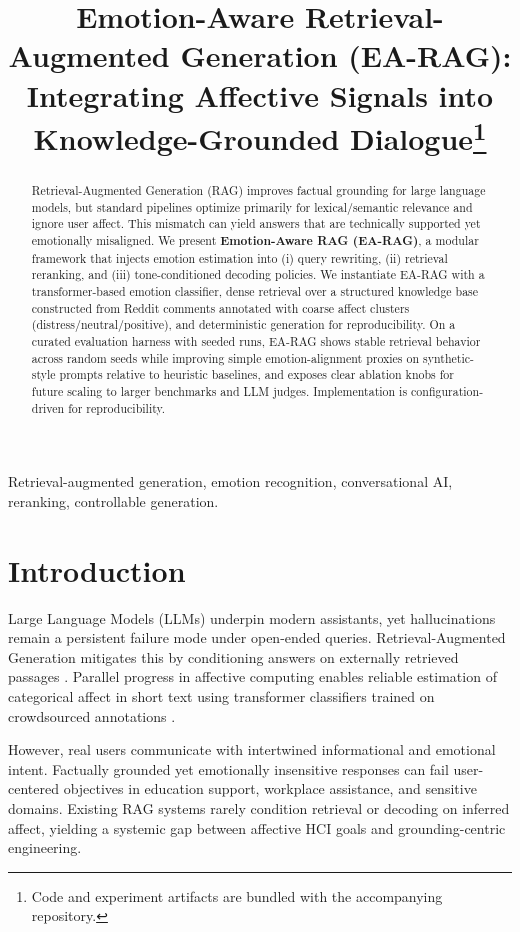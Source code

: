 \documentclass[conference]{IEEEtran}
\title{Emotion-Aware Retrieval-Augmented Generation (EA-RAG):\\Integrating Affective Signals into Knowledge-Grounded Dialogue\thanks{Code and experiment artifacts are bundled with the accompanying repository.}}
\author{
\IEEEauthorblockN{Your Name}
\IEEEauthorblockA{\textit{Affiliation Name}\\
City, Country\\
email@domain}
\and
\IEEEauthorblockN{Co-Author Name}
\IEEEauthorblockA{\textit{Affiliation Name}\\
City, Country\\
coauthor@domain}
}
\begin{document}
\maketitle

\begin{abstract}
Retrieval-Augmented Generation (RAG) improves factual grounding for large language models, but standard pipelines optimize primarily for lexical/semantic relevance and ignore user affect. This mismatch can yield answers that are technically supported yet emotionally misaligned. We present \textbf{Emotion-Aware RAG (EA-RAG)}, a modular framework that injects emotion estimation into (i) query rewriting, (ii) retrieval reranking, and (iii) tone-conditioned decoding policies. We instantiate EA-RAG with a transformer-based emotion classifier, dense retrieval over a structured knowledge base constructed from Reddit comments annotated with coarse affect clusters (distress/neutral/positive), and deterministic generation for reproducibility. On a curated evaluation harness with seeded runs, EA-RAG shows stable retrieval behavior across random seeds while improving simple emotion-alignment proxies on synthetic-style prompts relative to heuristic baselines, and exposes clear ablation knobs for future scaling to larger benchmarks and LLM judges. Implementation is configuration-driven for reproducibility.
\end{abstract}

\begin{IEEEkeywords}
Retrieval-augmented generation, emotion recognition, conversational AI, reranking, controllable generation.
\end{IEEEkeywords}

\section{Introduction}
Large Language Models (LLMs) underpin modern assistants, yet hallucinations remain a persistent failure mode under open-ended queries. Retrieval-Augmented Generation mitigates this by conditioning answers on externally retrieved passages \cite{lewis2020rag}. Parallel progress in affective computing enables reliable estimation of categorical affect in short text using transformer classifiers trained on crowdsourced annotations \cite{demszky2020goemotions}.

However, real users communicate with intertwined informational and emotional intent. Factually grounded yet emotionally insensitive responses can fail user-centered objectives in education support, workplace assistance, and sensitive domains. Existing RAG systems rarely condition retrieval or decoding on inferred affect, yielding a systemic gap between affective HCI goals and grounding-centric engineering.
\end{document}
